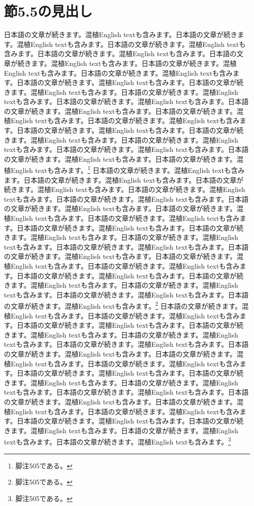 \documentclass[pdflatex,book]{jlreq}
\begin{document}
\section{節5.5の見出し}
日本語の文章が続きます。混植English textも含みます。日本語の文章が続きます。混植English textも含みます。日本語の文章が続きます。混植English textも含みます。日本語の文章が続きます。混植English textも含みます。日本語の文章が続きます。混植English textも含みます。日本語の文章が続きます。混植English textも含みます。日本語の文章が続きます。混植English textも含みます。日本語の文章が続きます。混植English textも含みます。日本語の文章が続きます。混植English textも含みます。日本語の文章が続きます。混植English textも含みます。日本語の文章が続きます。混植English textも含みます。日本語の文章が続きます。混植English textも含みます。日本語の文章が続きます。混植English textも含みます。日本語の文章が続きます。混植English textも含みます。日本語の文章が続きます。混植English textも含みます。日本語の文章が続きます。混植English textも含みます。日本語の文章が続きます。混植English textも含みます。日本語の文章が続きます。混植English textも含みます。日本語の文章が続きます。混植English textも含みます。日本語の文章が続きます。混植English textも含みます。\footnote{脚注505である。}
日本語の文章が続きます。混植English textも含みます。日本語の文章が続きます。混植English textも含みます。日本語の文章が続きます。混植English textも含みます。日本語の文章が続きます。混植English textも含みます。日本語の文章が続きます。混植English textも含みます。日本語の文章が続きます。混植English textも含みます。日本語の文章が続きます。混植English textも含みます。日本語の文章が続きます。混植English textも含みます。日本語の文章が続きます。混植English textも含みます。日本語の文章が続きます。混植English textも含みます。日本語の文章が続きます。混植English textも含みます。日本語の文章が続きます。混植English textも含みます。日本語の文章が続きます。混植English textも含みます。日本語の文章が続きます。混植English textも含みます。日本語の文章が続きます。混植English textも含みます。日本語の文章が続きます。混植English textも含みます。日本語の文章が続きます。混植English textも含みます。日本語の文章が続きます。混植English textも含みます。日本語の文章が続きます。混植English textも含みます。日本語の文章が続きます。混植English textも含みます。\footnote{脚注505である。}
日本語の文章が続きます。混植English textも含みます。日本語の文章が続きます。混植English textも含みます。日本語の文章が続きます。混植English textも含みます。日本語の文章が続きます。混植English textも含みます。日本語の文章が続きます。混植English textも含みます。日本語の文章が続きます。混植English textも含みます。日本語の文章が続きます。混植English textも含みます。日本語の文章が続きます。混植English textも含みます。日本語の文章が続きます。混植English textも含みます。日本語の文章が続きます。混植English textも含みます。日本語の文章が続きます。混植English textも含みます。日本語の文章が続きます。混植English textも含みます。日本語の文章が続きます。混植English textも含みます。日本語の文章が続きます。混植English textも含みます。日本語の文章が続きます。混植English textも含みます。日本語の文章が続きます。混植English textも含みます。日本語の文章が続きます。混植English textも含みます。日本語の文章が続きます。混植English textも含みます。日本語の文章が続きます。混植English textも含みます。日本語の文章が続きます。混植English textも含みます。\footnote{脚注505である。}
\end{document}

